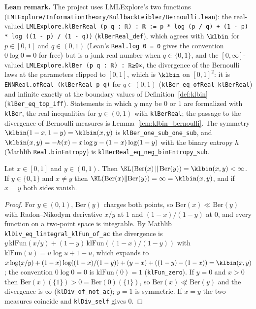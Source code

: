 \textbf{Lean remark.} The project uses LMLExplore's two functions
(\texttt{LMLExplore/InformationTheory/KullbackLeibler/Bernoulli.lean}): the real-valued
\texttt{LMLExplore.klBerReal (p q : ℝ) : ℝ := p * log (p / q) + (1 - p) * log ((1 - p) / (1 - q))}
(\texttt{klBerReal\_def}), which agrees with $\klbin$ for $p \in [0,1]$ and $q \in (0,1)$ (Lean's
\texttt{Real.log 0 = 0} gives the convention $0\log 0 = 0$ for free) but is a junk real number
when $q \in \{0, 1\}$, and the $[0,\infty]$-valued \texttt{LMLExplore.klBer (p q : ℝ) : ℝ≥0∞}, the
divergence of the Bernoulli laws at the parameters clipped to $[0, 1]$, which is $\klbin$ on
$[0, 1]^2$: it is \texttt{ENNReal.ofReal (klBerReal p q)} for $q \in (0, 1)$
(\texttt{klBer\_eq\_ofReal\_klBerReal}) and infinite exactly at the boundary values of
Definition~\ref{def:klbin} (\texttt{klBer\_eq\_top\_iff}). Statements in which $y$ may be $0$ or
$1$ are formalized with \texttt{klBer}, the real inequalities for $y \in (0, 1)$ with
\texttt{klBerReal}; the passage to the divergence of Bernoulli measures is
Lemma~\ref{lem:klbin_bernoulli}. The symmetry $\klbin(1-x, 1-y) = \klbin(x, y)$ is
\texttt{klBer\_one\_sub\_one\_sub}, and $\klbin(x,y) = -h(x) - x\log y - (1-x)\log(1-y)$ with the
binary entropy $h$ (Mathlib \texttt{Real.binEntropy}) is
\texttt{klBerReal\_eq\_neg\_binEntropy\_sub}.

\begin{lemma}\label{lem:klbin_bernoulli}
\leanok
{}
Let $x \in [0, 1]$ and $y \in (0, 1)$. Then
$\KL(\mathrm{Ber}(x)\,\|\,\mathrm{Ber}(y)) = \klbin(x, y) < \infty$. If $y \in \{0, 1\}$ and
$x \ne y$ then $\KL(\mathrm{Ber}(x)\|\mathrm{Ber}(y)) = \infty = \klbin(x, y)$, and if $x = y$
both sides vanish.
\end{lemma}

\begin{proof}
\leanok
For $y \in (0, 1)$, $\mathrm{Ber}(y)$ charges both points, so $\mathrm{Ber}(x) \ll \mathrm{Ber}(y)$
with Radon--Nikodym derivative $x/y$ at $1$ and $(1-x)/(1-y)$ at $0$, and every function on a
two-point space is integrable. By Mathlib \texttt{klDiv\_eq\_lintegral\_klFun\_of\_ac} the
divergence is $y\,\mathrm{klFun}(x/y) + (1-y)\,\mathrm{klFun}((1-x)/(1-y))$ with
$\mathrm{klFun}(u) = u\log u + 1 - u$, which expands to
$x\log(x/y) + (1-x)\log((1-x)/(1-y)) + (y - x) + ((1-y) - (1-x)) = \klbin(x, y)$; the
convention $0\log 0 = 0$ is $\mathrm{klFun}(0) = 1$ (\texttt{klFun\_zero}). If $y = 0$ and
$x > 0$ then $\mathrm{Ber}(x)(\{1\}) > 0 = \mathrm{Ber}(0)(\{1\})$, so
$\mathrm{Ber}(x) \not\ll \mathrm{Ber}(y)$ and the divergence is $\infty$
(\texttt{klDiv\_of\_not\_ac}); $y = 1$ is symmetric. If $x = y$ the two measures coincide and
\texttt{klDiv\_self} gives $0$.
\end{proof}

